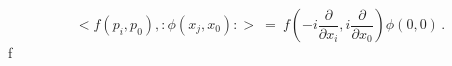 \begin{equation}< f(p_i , p_0) , :\phi( x_j , x_0 ): > \
= \ f\left(-i\frac{\partial}{\partial x_i} , i
\frac{\partial}{\partial x_0}\right) \phi ( 0 , 0 )\,
.\label{r214}\end{equation}f

